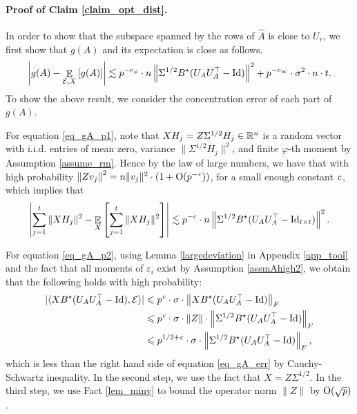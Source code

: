 	\paragraph{Proof of Claim \ref{claim_opt_dist}.}
	In order to show that the subspace spanned by the rows of $\hat{A}$ is close to $U_r$, we first show that $g(A)$ and its expectation is close as follows.
	\begin{align}\label{eq_gA_err}
		{\left| {g(A) - \mathop{\mathbb{E}}_{\mathcal{E}, X}\left[ g(A) \right]} \right|} \lesssim p^{-c_{\varphi}} \cdot n \left\| \Sigma^{1/2} B^{\star} (U_AU_A^{\top} - \operatorname{Id}) \right\|^2 + p^{-c_{\infty}} \cdot \sigma^2 \cdot n \cdot t.
	\end{align}
	To show the above result, we consider the concentration error of each part of $g(A)$.

	For equation \eqref{eq_gA_p1}, %
	note that $X H_j = Z \Sigma^{1/2} H_j \in \mathbb{R}^n$ is a random vector with i.i.d. entries of mean zero, variance $\|\Sigma^{1/2}H_j\|^2$, and finite $\varphi$-th moment by Assumption \eqref{assume_rm}.
	Hence by the law of large numbers, we have that with high probability
	${\left\|Z v_j \right\|^2 } = { n \|v_j\|^2} \cdot (1 + \operatorname{O}(p^{-{\mathit{c}}}))$, for a small enough constant ${\mathit{c}}$,
	which implies that
	\begin{align}
		\left\lvert\sum_{j=1}^t \|X H_j\|^2 - \mathop{\mathbb{E}}_{X}\left[ \sum_{j=1}^t \|X H_j\|^2 \right]\right\rvert \lesssim p^{-c} \cdot n \left\| \Sigma^{1/2} B^{\star} (U_{A}U_A^{\top} - \operatorname{Id}_{t\times t}) \right\|^2. \label{eq_gA_err1}
	\end{align}

	For equation \eqref{eq_gA_p2}, using Lemma \ref{largedeviation} in Appendix \ref{app_tool} and the fact that all moments of $\varepsilon_i$ exist by Assumption \eqref{assmAhigh2}, we obtain that the following holds with high probability:
	\begin{align}
		|\langle XB^{\star} (U_AU_A^{\top} - \operatorname{Id}), \mathcal{E} \rangle| &\leqslant p^{\mathit{c}} \cdot \sigma \cdot \left\| XB^{\star} (U_AU_A^{\top} - \operatorname{Id}) \right\|_{F} \nonumber \\
		&\leqslant p^{{\mathit{c}}} \cdot \sigma \cdot \|Z\| \cdot \left\| \Sigma^{1/2} B^{\star}(U_AU_A^{\top} -\operatorname{Id}) \right\|_{F} \nonumber \\
		&\leqslant p^{1/2 + {\mathit{c}}} \cdot \sigma \cdot \left\| \Sigma^{1/2} B^{\star}(U_AU_A^{\top} -\operatorname{Id}) \right\|_{F}, \label{eq_gA_err2}
	\end{align}
	which is less than the right hand side of equation \eqref{eq_gA_err} by Cauchy-Schwartz inequality.
	In the second step, we use the fact that $X=Z\Sigma^{1/2}$.
	In the third step, we use Fact \ref{lem_minv} to bound the operator norm $\|Z\|$ by $\operatorname{O}(\sqrt{p})$.

